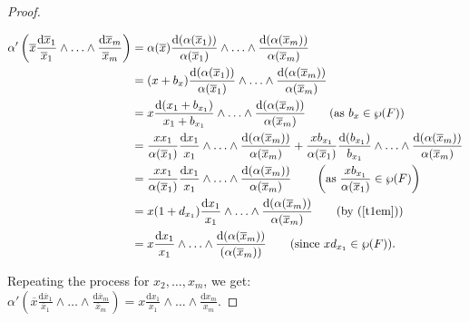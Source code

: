 \documentclass[times,10pt]{amsart}
\begin{document}
{\begin{proof}
\begin{center}
\begin{align*}
         \alpha'\left( {\overline{x} \frac{\mathrm{d}\overline{x}_1}{\overline{x}_1}\wedge \ldots \wedge \frac{\mathrm{d}\overline{x}_m}{\overline{x}_m}}\right)&= { \alpha(\overline{x})\frac{\mathrm{d}(\alpha(\overline{x}_1))}{\alpha(\overline{x}_1)}\wedge \ldots \wedge \frac{\mathrm{d}(\alpha(\overline{x}_m))}{\alpha(\overline{x}_m)}}\\&= { ( x+ b_x)\frac{\mathrm{d}(\alpha(\overline{x}_1))}{\alpha(\overline{x}_1)}\wedge \ldots \wedge \frac{\mathrm{d}(\alpha(\overline{x}_m))}{\alpha(\overline{x}_m)}}\\&= { x\frac{\mathrm{d}(x_1+b_{x_1})}{x_1+ b_{x_1}}\wedge \ldots \wedge \frac{\mathrm{d}(\alpha(\overline{x}_m))}{\alpha(\overline{x}_m)}} \qquad \text{(as $ b_x\in \wp(F)$)}\\ &= {\frac{x x_1}{\alpha(\overline{x}_1)}\frac{\mathrm{d}x_1}{x_1}\wedge \ldots \wedge \frac{\mathrm{d}(\alpha(\overline{x}_m))}{\alpha(\overline{x}_m)} }+ { \frac{xb_{x_1}}{\alpha(\overline{x}_1)}\frac{\mathrm{d}(b_{x_1})}{b_{x_1}}\wedge \ldots \wedge \frac{\mathrm{d}(\alpha(\overline{x}_m))}{\alpha(\overline{x}_m)}}\\&= {\frac{xx_{1}}{\alpha(\overline{x}_1)}\frac{\mathrm{d}x_{1}}{x_1}\wedge \ldots \wedge \frac{\mathrm{d}(\alpha(\overline{x}_m))}{\alpha(\overline{x}_m)}} \qquad \left(\text{as}\hspace{1mm} \frac{xb_{x_1}}{\alpha(\overline{x}_1)}\in \wp( F)\right)\\& = { x(1+d_{x_1})\frac{\mathrm{d}x_1}{x_1}\wedge \ldots \wedge \frac{\mathrm{d}(\alpha(\overline{x}_m))}{\alpha(\overline{x}_m)}} \qquad\text{(by  (\ref{t1em}))} \\&=  { x\frac{ \mathrm{d}x_1}{x_1}\wedge \ldots \wedge \frac{\mathrm{d}(\alpha(\overline{x}_m))}{(\alpha(\overline{x}_m))}}\qquad \text{(since  $xd_{x_1}\in \wp(F)$)}.\end{align*}\end{center}{Repeating the  process for $x_2,\ldots, x_m$,   we  get: } $\displaystyle{\alpha'\left( { \overline{x}\frac{\mathrm{d}\overline{x}_1}{\overline{x}_1}\wedge \ldots \wedge \frac{\mathrm{d}\overline{x}_m}{\overline{x}_m}}\right) = { x\frac{\mathrm{d}x_1}{x_1}\wedge \ldots \wedge \frac{\mathrm{d}x_m}{x_m}}}.$

         


\end{proof}}
\end{document}
